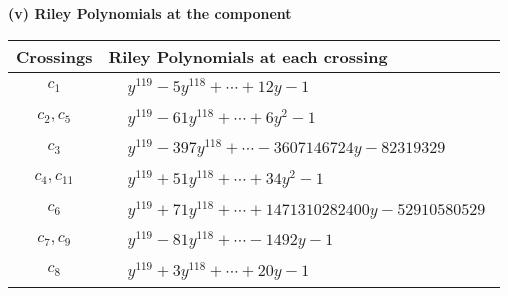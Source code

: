 \documentclass[1p]{elsarticle_modified}
\theoremstyle{definition}
\begin{document}
\newpage\renewcommand{\arraystretch}{1}
\flushleft \textbf{(v) Riley Polynomials at the component}\newline \\
\begin{tabular}{m{50pt}|m{274pt}}
Crossings & \hspace{64pt}Riley Polynomials at each crossing \\
\hline $$\begin{aligned}c_{1}\end{aligned}$$&$\begin{aligned}
&y^{119}-5 y^{118}+\cdots+12 y-1
\end{aligned}$\\
\hline $$\begin{aligned}c_{2},c_{5}\end{aligned}$$&$\begin{aligned}
&y^{119}-61 y^{118}+\cdots+6 y^2-1
\end{aligned}$\\
\hline $$\begin{aligned}c_{3}\end{aligned}$$&$\begin{aligned}
&y^{119}-397 y^{118}+\cdots-3607146724 y-82319329
\end{aligned}$\\
\hline $$\begin{aligned}c_{4},c_{11}\end{aligned}$$&$\begin{aligned}
&y^{119}+51 y^{118}+\cdots+34 y^2-1
\end{aligned}$\\
\hline $$\begin{aligned}c_{6}\end{aligned}$$&$\begin{aligned}
&y^{119}+71 y^{118}+\cdots+1471310282400 y-52910580529
\end{aligned}$\\
\hline $$\begin{aligned}c_{7},c_{9}\end{aligned}$$&$\begin{aligned}
&y^{119}-81 y^{118}+\cdots-1492 y-1
\end{aligned}$\\
\hline $$\begin{aligned}c_{8}\end{aligned}$$&$\begin{aligned}
&y^{119}+3 y^{118}+\cdots+20 y-1
\end{aligned}$\\

\end{tabular}
\end{document}
